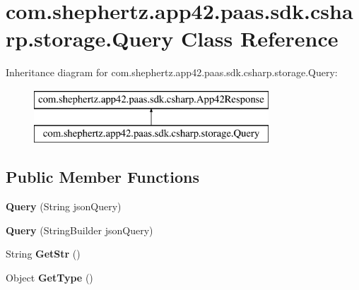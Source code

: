 \hypertarget{classcom_1_1shephertz_1_1app42_1_1paas_1_1sdk_1_1csharp_1_1storage_1_1_query}{\section{com.\+shephertz.\+app42.\+paas.\+sdk.\+csharp.\+storage.\+Query Class Reference}
\label{classcom_1_1shephertz_1_1app42_1_1paas_1_1sdk_1_1csharp_1_1storage_1_1_query}
}
Inheritance diagram for com.\+shephertz.\+app42.\+paas.\+sdk.\+csharp.\+storage.\+Query\+:\begin{figure}[H]
\begin{center}
\leavevmode
\includegraphics[height=2.000000cm]{classcom_1_1shephertz_1_1app42_1_1paas_1_1sdk_1_1csharp_1_1storage_1_1_query}
\end{center}
\end{figure}
\subsection*{Public Member Functions}
\begin{DoxyCompactItemize}
\item 
\hypertarget{classcom_1_1shephertz_1_1app42_1_1paas_1_1sdk_1_1csharp_1_1storage_1_1_query_a16a8120cbaddb700fa6a1ea323bfb944}{{\bfseries Query} (String json\+Query)}\label{classcom_1_1shephertz_1_1app42_1_1paas_1_1sdk_1_1csharp_1_1storage_1_1_query_a16a8120cbaddb700fa6a1ea323bfb944}

\item 
\hypertarget{classcom_1_1shephertz_1_1app42_1_1paas_1_1sdk_1_1csharp_1_1storage_1_1_query_a08e32616f18077533341afe7d4c951aa}{{\bfseries Query} (String\+Builder json\+Query)}\label{classcom_1_1shephertz_1_1app42_1_1paas_1_1sdk_1_1csharp_1_1storage_1_1_query_a08e32616f18077533341afe7d4c951aa}

\item 
\hypertarget{classcom_1_1shephertz_1_1app42_1_1paas_1_1sdk_1_1csharp_1_1storage_1_1_query_a81ba7ecb379b3597850276ae6552f8b4}{String {\bfseries Get\+Str} ()}\label{classcom_1_1shephertz_1_1app42_1_1paas_1_1sdk_1_1csharp_1_1storage_1_1_query_a81ba7ecb379b3597850276ae6552f8b4}

\item 
\hypertarget{classcom_1_1shephertz_1_1app42_1_1paas_1_1sdk_1_1csharp_1_1storage_1_1_query_a7f6c2a5cd5b9b6da871e71b376a84010}{Object {\bfseries Get\+Type} ()}\label{classcom_1_1shephertz_1_1app42_1_1paas_1_1sdk_1_1csharp_1_1storage_1_1_query_a7f6c2a5cd5b9b6da871e71b376a84010}

\end{DoxyCompactItemize}
